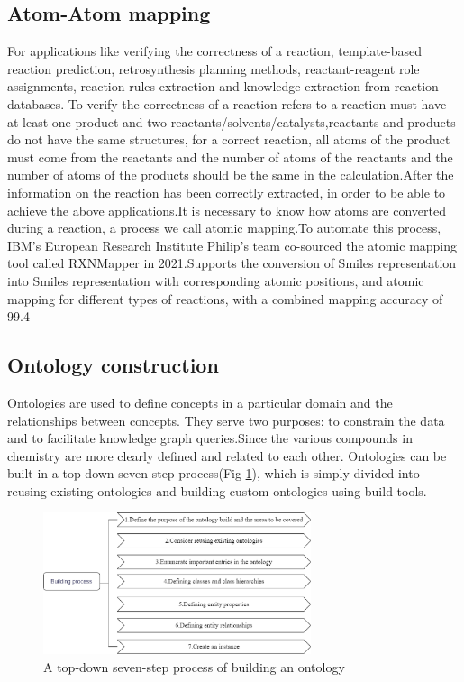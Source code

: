 \documentclass[%
 aip,
 jmp,%
 amsmath,amssymb,
 reprint,%
]{revtex4-2}
\begin{document}
\subsection{Atom-Atom mapping}
For applications like verifying the correctness of a reaction, template-based reaction prediction, 
retrosynthesis planning methods, reactant-reagent role assignments, reaction rules extraction and knowledge
extraction from reaction databases. To verify the correctness of a reaction refers to a reaction must have 
at least one product and two reactants/solvents/catalysts,reactants and products do not have the same structures,
for a correct reaction, all atoms of the product must come from the reactants and the number of atoms of the
reactants and the number of atoms of the products should be the same in the calculation.After the information on 
the reaction has been correctly extracted, in order to be able to achieve the above applications.It is necessary
to know how atoms are converted during a reaction, a process we call atomic mapping.To automate this process, 
IBM's European Research Institute Philip's team co-sourced the atomic mapping tool called RXNMapper 
in 2021.Supports the conversion of Smiles representation into Smiles representation with 
corresponding atomic positions, and atomic mapping for different types of reactions, 
with a combined mapping accuracy of 99.4%

\subsection{Ontology construction}
Ontologies are used to define concepts in a particular domain and the relationships between concepts. They serve two purposes: to constrain 
the data and to facilitate knowledge graph queries.Since the various compounds in chemistry are more clearly defined and related to each other.
Ontologies can be built in a top-down seven-step process(Fig \ref{ Fig.4 }), which is simply divided 
into reusing existing ontologies and building custom ontologies using build tools.
\begin{figure}[htbp]
 \centering
 \includegraphics[width=0.7\textwidth]{figure/4.png}
 \caption{ A top-down seven-step process of building an ontology }
 \label{ Fig.4 }
\end{figure}
\end{document}

